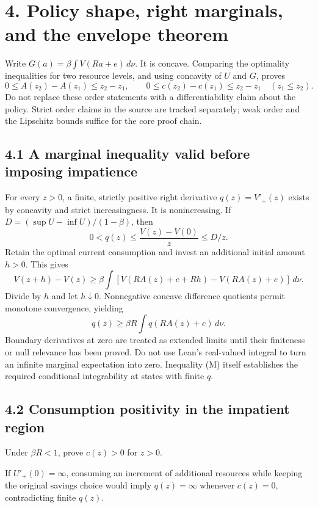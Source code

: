 \documentclass[
  11pt,
]{article}
\begin{document}
\section{4. Policy shape, right marginals, and the envelope
theorem}\label{policy-shape-right-marginals-and-the-envelope-theorem}

Write \(G(a)=\beta\int V(Ra+e)\,d\nu\). It is concave. Comparing the
optimality inequalities for two resource levels, and using concavity of
\(U\) and \(G\), proves \[
0\leq A(z_2)-A(z_1)\leq z_2-z_1,\qquad
0\leq c(z_2)-c(z_1)\leq z_2-z_1\quad(z_1\leq z_2).
\] Do not replace these order statements with a differentiability claim
about the policy. Strict order claims in the source are tracked
separately; weak order and the Lipschitz bounds suffice for the core
proof chain.

\subsection{4.1 A marginal inequality valid before imposing
impatience}\label{a-marginal-inequality-valid-before-imposing-impatience}

For every \(z>0\), a finite, strictly positive right derivative
\(q(z)=V'_+(z)\) exists by concavity and strict increasingness. It is
nonincreasing. If \(D=(\sup U-\inf U)/(1-\beta)\), then \[
0<q(z)\leq\frac{V(z)-V(0)}{z}\leq D/z.
\] Retain the optimal current consumption and invest an additional
initial amount \(h>0\). This gives \[
V(z+h)-V(z)\geq\beta\int[V(RA(z)+e+Rh)-V(RA(z)+e)]\,d\nu.
\] Divide by \(h\) and let \(h\downarrow0\). Nonnegative concave
difference quotients permit monotone convergence, yielding \[
q(z)\geq\beta R\int q(RA(z)+e)\,d\nu. \tag{M}
\] Boundary derivatives at zero are treated as extended limits until
their finiteness or null relevance has been proved. Do not use Lean's
real-valued integral to turn an infinite marginal expectation into zero.
Inequality (M) itself establishes the required conditional integrability
at states with finite \(q\).

\subsection{4.2 Consumption positivity in the impatient
region}\label{consumption-positivity-in-the-impatient-region}

Under \(\beta R<1\), prove \(c(z)>0\) for \(z>0\).

If \(U'_+(0)=\infty\), consuming an increment of additional resources
while keeping the original savings choice would imply \(q(z)=\infty\)
whenever \(c(z)=0\), contradicting finite \(q(z)\).
\end{document}
